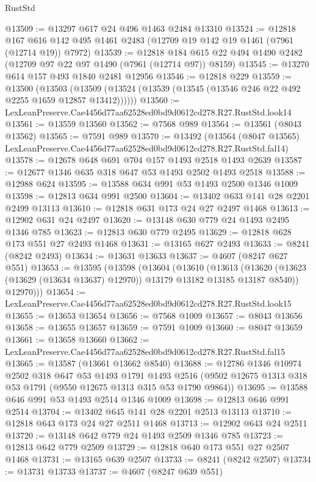 \begin{lexlean}{RustStd}
\begin{coremodule}
@13509 := @13297 @617 @24 @496 @1463 @2484 @13310
@13524 := @12818
    @167
    @616
    @142
    @495
    @1461
    @2483
    (@12709 @19 @142 @19 @1461 (@7961 (@12714 @19)) @7972)
@13539 := @12818
    @184
    @615
    @22
    @494
    @1490
    @2482
    (@12709 @97 @22 @97 @1490 (@7961 (@12714 @97)) @8159)
@13545 := @13270 @614 @157 @493 @1840 @2481 @12956
@13546 := @12818 @229
@13559 := @13500
    (@13503 (@13509 (@13524 (@13539 (@13545 (@13546 @246 @22 @492 @2255 @1659 @12857 @13412))))))
@13560 := LexLeanPreserve.Cae4456d77aa62528ed0bd9d0612cd278.R27.RustStd.look14
@13561 := @13559 @13560
@13562 := @7568 @989
@13564 := @13561 (@8043 @13562)
@13565 := @7591 @989
@13570 := @13492
    (@13564 (@8047 @13565) LexLeanPreserve.Cae4456d77aa62528ed0bd9d0612cd278.R27.RustStd.fal14)
@13578 := @12678 @648 @691 @704 @157 @1493 @2518 @1493 @2639
@13587 := @12677 @1346 @635 @318 @647 @53 @1493 @2502 @1493 @2518
@13588 := @12988 @624
@13595 := @13588 @634 @991 @53 @1493 @2500 @1346 @1009
@13598 := @12813 @634 @991 @2500
@13604 := @13402 @633 @141 @28 @2201 @2499 @13113
@13610 := @12818 @631 @173 @24 @27 @2497 @1468
@13613 := @12902 @631 @24 @2497
@13620 := @13148 @630 @779 @24 @1493 @2495 @1346 @785
@13623 := @12813 @630 @779 @2495
@13629 := @12818 @628 @173 @551 @27 @2493 @1468
@13631 := @13165 @627 @2493
@13633 := @8241 (@8242 @2493)
@13634 := @13631 @13633
@13637 := @4607 (@8247 @627 @551)
@13653 := @13595
    (@13598
      (@13604
        (@13610
          (@13613
            (@13620 (@13623 (@13629 (@13634 @13637) @12970)) @13179 @13182 @13185 @13187 @8540))
          @12970)))
@13654 := LexLeanPreserve.Cae4456d77aa62528ed0bd9d0612cd278.R27.RustStd.look15
@13655 := @13653 @13654
@13656 := @7568 @1009
@13657 := @8043 @13656
@13658 := @13655 @13657
@13659 := @7591 @1009
@13660 := @8047 @13659
@13661 := @13658 @13660
@13662 := LexLeanPreserve.Cae4456d77aa62528ed0bd9d0612cd278.R27.RustStd.fal15
@13665 := @13587 (@13661 @13662 @8540)
@13688 := @12786
    @1346
    @10974
    @2502
    @318
    @647
    @53
    @1493
    @1791
    @1493
    @2516
    (@9502 @12675 @1313 @318 @53 @1791 (@9550 @12675 @1313 @315 @53 @1790 @9864))
@13695 := @13588 @646 @991 @53 @1493 @2514 @1346 @1009
@13698 := @12813 @646 @991 @2514
@13704 := @13402 @645 @141 @28 @2201 @2513 @13113
@13710 := @12818 @643 @173 @24 @27 @2511 @1468
@13713 := @12902 @643 @24 @2511
@13720 := @13148 @642 @779 @24 @1493 @2509 @1346 @785
@13723 := @12813 @642 @779 @2509
@13729 := @12818 @640 @173 @551 @27 @2507 @1468
@13731 := @13165 @639 @2507
@13733 := @8241 (@8242 @2507)
@13734 := @13731 @13733
@13737 := @4607 (@8247 @639 @551)

\end{coremodule}
\end{lexlean}
